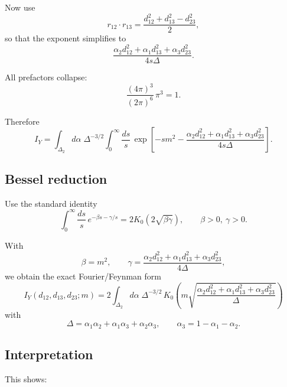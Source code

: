 Now use
\begin{equation}
r_{12}\cdot r_{13}
=
\frac{d_{12}^2+d_{13}^2-d_{23}^2}{2},
\end{equation}
so that the exponent simplifies to
\begin{equation}
\frac{
\alpha_2 d_{12}^2+\alpha_1 d_{13}^2+\alpha_3 d_{23}^2
}{
4 s \Delta
}.
\end{equation}

All prefactors collapse:
\begin{equation}
\frac{(4\pi)^3}{(2\pi)^6}\,\pi^3 = 1.
\end{equation}

Therefore
\begin{equation}
I_Y
=
\int_{\Delta_2} d\alpha\;
\Delta^{-3/2}
\int_0^\infty \frac{ds}{s}\,
\exp\left[
-s m^2
-
\frac{
\alpha_2 d_{12}^2+\alpha_1 d_{13}^2+\alpha_3 d_{23}^2
}{
4 s \Delta
}
\right].
\end{equation}

\subsection{Bessel reduction}

Use the standard identity
\begin{equation}
\int_0^\infty \frac{ds}{s}\,e^{-\beta s-\gamma/s}
=
2 K_0\!\left(2\sqrt{\beta\gamma}\right),
\qquad
\beta>0,\ \gamma>0.
\end{equation}

With
\begin{equation}
\beta = m^2,
\qquad
\gamma=
\frac{
\alpha_2 d_{12}^2+\alpha_1 d_{13}^2+\alpha_3 d_{23}^2
}{
4\Delta
},
\end{equation}
we obtain the exact Fourier/Feynman form
\begin{equation}
\boxed{
I_Y(d_{12},d_{13},d_{23};m)
=
2\int_{\Delta_2} d\alpha\;
\Delta^{-3/2}\,
K_0\!\left(
m\sqrt{
\frac{
\alpha_2 d_{12}^2+\alpha_1 d_{13}^2+\alpha_3 d_{23}^2
}{
\Delta
}
}
\right)
}
\end{equation}
with
\begin{equation}
\Delta=
\alpha_1\alpha_2+\alpha_1\alpha_3+\alpha_2\alpha_3,
\qquad
\alpha_3=1-\alpha_1-\alpha_2.
\end{equation}

\subsection{Interpretation}

This shows:

